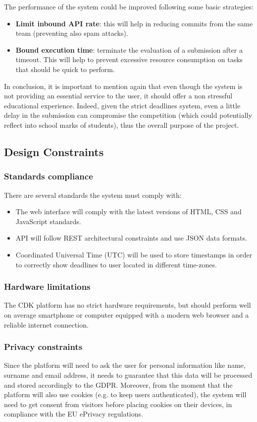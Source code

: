 The performance of the system could be improved following some basic strategies:
\begin{itemize}
    \item \textbf{Limit inbound API rate}: this will help in reducing commits from the same team (preventing also spam attacks).
    \item \textbf{Bound execution time}: terminate the evaluation of a submission after a timeout. This will help to prevent excessive resource consumption on tasks that should be quick to perform. 
\end{itemize}
In conclusion, it is important to mention again that even though the system is not providing an essential service to the user, it should offer a non stressful educational experience. Indeed, given the strict deadlines system, even a little delay in the submission can compromise the competition (which could potentially reflect into school marks of students), thus the overall purpose of the project.

\subsection{Design Constraints}
\subsubsection{Standards compliance}
There are several standards the system must comply with:
\begin{itemize}
    \item The web interface will comply with the latest versions of HTML, CSS and JavaScript standards.
    \item API will follow REST architectural constraints and use JSON data formats.
    \item Coordinated Universal Time (UTC) will be used to store timestamps in order to correctly show deadlines to user located in different time-zones.
\end{itemize}
\subsubsection{Hardware limitations}
The CDK platform has no strict hardware requirements, but should perform well on average smartphone or computer equipped with a modern web browser and a reliable internet connection.
\subsubsection{Privacy constraints}
Since the platform will need to ask the user for personal information like name, surname and email address, it needs to guarantee that this data will be processed and stored accordingly to the GDPR. Moreover, from the moment that the platform will also use cookies (e.g. to keep users authenticated), the system will need to get consent from visitors before placing cookies on their devices, in compliance with the EU ePrivacy regulations.
